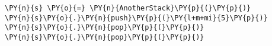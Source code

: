 \begin{Verbatim}[commandchars=\\\{\}]
\PY{n}{s} \PY{o}{=} \PY{n}{AnotherStack}\PY{p}{(}\PY{p}{)}
\PY{n}{s}\PY{o}{.}\PY{n}{push}\PY{p}{(}\PY{l+m+mi}{5}\PY{p}{)}
\PY{n}{s}\PY{o}{.}\PY{n}{pop}\PY{p}{(}\PY{p}{)}
\PY{n}{s}\PY{o}{.}\PY{n}{pop}\PY{p}{(}\PY{p}{)}
\end{Verbatim}

\begin{Verbatim}
\end{Verbatim}
